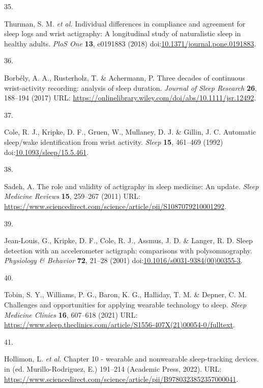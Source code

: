 \documentclass[
  9pt,
]{scrbook}
\newlength{\cslhangindent}
\newlength{\csllabelwidth}
\newlength{\cslentryspacingunit} %
\newenvironment{CSLReferences}[2] %
 {%
  \setlength{\parindent}{0pt}
  \ifodd #1
  \let\oldpar\par
  \def\par{\hangindent=\cslhangindent\oldpar}
  \fi
  \setlength{\parskip}{#2\cslentryspacingunit}
 }%
 {}
\newcommand{\CSLLeftMargin}[1]{\parbox[t]{\csllabelwidth}{#1}}
\newcommand{\CSLRightInline}[1]{\parbox[t]{\linewidth - \csllabelwidth}{#1}\break}
\begin{document}
\begin{CSLReferences}{0}{0}
\leavevmode{}%
\CSLLeftMargin{35. }%
\CSLRightInline{Thurman, S. M. \emph{et al.} Individual differences in
compliance and agreement for sleep logs and wrist actigraphy: A
longitudinal study of naturalistic sleep in healthy adults. \emph{PloS
One} \textbf{13}, e0191883 (2018)
doi:\href{https://doi.org/10.1371/journal.pone.0191883}{10.1371/journal.pone.0191883}.}

\leavevmode{}%
\CSLLeftMargin{36. }%
\CSLRightInline{Borbély, A. A., Rusterholz, T. \& Achermann, P. Three
decades of continuous wrist-activity recording: analysis of sleep
duration. \emph{Journal of Sleep Research} \textbf{26}, 188--194 (2017)
URL: \url{https://onlinelibrary.wiley.com/doi/abs/10.1111/jsr.12492}.}

\leavevmode{}%
\CSLLeftMargin{37. }%
\CSLRightInline{Cole, R. J., Kripke, D. F., Gruen, W., Mullaney, D. J.
\& Gillin, J. C. Automatic sleep/wake identification from wrist
activity. \emph{Sleep} \textbf{15}, 461--469 (1992)
doi:\href{https://doi.org/10.1093/sleep/15.5.461}{10.1093/sleep/15.5.461}.}

\leavevmode{}%
\CSLLeftMargin{38. }%
\CSLRightInline{Sadeh, A. The role and validity of actigraphy in sleep
medicine: An update. \emph{Sleep Medicine Reviews} \textbf{15}, 259--267
(2011) URL:
\url{https://www.sciencedirect.com/science/article/pii/S1087079210001292}.}

\leavevmode{}%
\CSLLeftMargin{39. }%
\CSLRightInline{Jean-Louis, G., Kripke, D. F., Cole, R. J., Assmus, J.
D. \& Langer, R. D. Sleep detection with an accelerometer actigraph:
comparisons with polysomnography. \emph{Physiology \& Behavior}
\textbf{72}, 21--28 (2001)
doi:\href{https://doi.org/10.1016/s0031-9384(00)00355-3}{10.1016/s0031-9384(00)00355-3}.}

\leavevmode{}%
\CSLLeftMargin{40. }%
\CSLRightInline{Tobin, S. Y., Williams, P. G., Baron, K. G., Halliday,
T. M. \& Depner, C. M. Challenges and opportunities for applying
wearable technology to sleep. \emph{Sleep Medicine Clinics} \textbf{16},
607--618 (2021) URL:
\url{https://www.sleep.theclinics.com/article/S1556-407X(21)00054-0/fulltext}.}

\leavevmode{}%
\CSLLeftMargin{41. }%
\CSLRightInline{Hollimon, L. \emph{et al.} Chapter 10 - wearable and
nonwearable sleep-tracking devices. in (ed. Murillo-Rodriguez, E.)
191--214 (Academic Press, 2022). URL:
\url{https://www.sciencedirect.com/science/article/pii/B9780323852357000041}.}


\end{CSLReferences}
\end{document}
